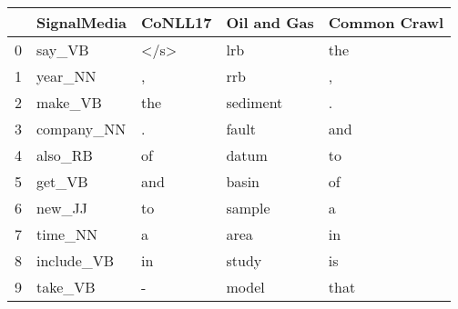 \begin{tabular}{lllll}
\toprule
{} & SignalMedia & CoNLL17 & Oil and Gas & Common Crawl \\
\midrule
0 &      say\_VB &    </s> &         lrb &          the \\
1 &     year\_NN &       , &         rrb &            , \\
2 &     make\_VB &     the &    sediment &            . \\
3 &  company\_NN &       . &       fault &          and \\
4 &     also\_RB &      of &       datum &           to \\
5 &      get\_VB &     and &       basin &           of \\
6 &      new\_JJ &      to &      sample &            a \\
7 &     time\_NN &       a &        area &           in \\
8 &  include\_VB &      in &       study &           is \\
9 &     take\_VB &       - &       model &         that \\
\bottomrule
\end{tabular}
